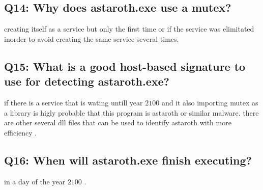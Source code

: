 \documentclass[10pt,a4paper]{article} %
\begin{document}
        \subsection{Q14: Why does astaroth.exe use a mutex?}
            creating itself as a service but only the first time or if the
            service was elimitated inorder to avoid creating the same service
            several times.

        \subsection{Q15: What is a good host-based signature to use for
        detecting astaroth.exe?}
            if there is a service that is wating untill year $ 2100  $  and it
            also importing mutex as a library is higly probable that this
            program is astaroth or similar malware. there are other several dll
            files that can be used to identify astaroth with more efficiency .

        \subsection{Q16: When will astaroth.exe finish executing?}
            in a day of the year $ 2100  $  .


















    \nocite{*}
    
    
\end{document}
